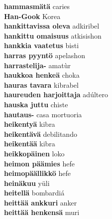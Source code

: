 \textbf{ hammasmätä  } caries \\
\textbf{ Han-Gook  } Korea \\
\textbf{ hankittavissa oleva  } adkiribel \\
\textbf{ hankittu omaisuus  } atkisishon \\
\textbf{ hankkia vaatetus  } bisti \\
\textbf{ harras pyyntö  } apelashon \\
\textbf{ harrastelija-  } amatùr \\
\textbf{ haukkoa henkeä  } choka \\
\textbf{ hauras tavara  } kibrabel \\
\textbf{ haureuden harjoittaja  } adúltero \\
\textbf{ hauska juttu  } chiste \\
\textbf{ hautaus-  } casa mortuoria \\
\textbf{ heikentyä  } kibra \\
\textbf{ heikentävä  } debilitando \\
\textbf{ heikentää  } kibra \\
\textbf{ heikkopäinen  } loko \\
\textbf{ heimon päämies  } hefe \\
\textbf{ heimopäällikkö  } hefe \\
\textbf{ heinäkuu  } yüli \\
\textbf{ heitellä  } bombardiá \\
\textbf{ heittää ankkuri  } anker \\
\textbf{ heittää henkensä  } muri \\
